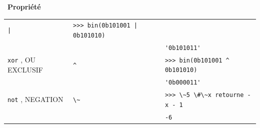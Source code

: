 \documentclass[
  11pt,
]{article}
\newcommand{\passthrough}[1]{#1}
\newcounter{prop}
\newenvironment{propriete}[1]
{\par \medskip   \addtocounter{prop}{1} \noindent  
\begin{bclogo}[arrondi =0.1,  ombre = true, barre=none, logo=\bcbook, marge=4]{~\textbf{Propriété} \textbf{\theprop} {\itshape #1} }   \par}
{
\end{bclogo}
 \par \bigskip }
\begin{document}
\begin{propriete}{}
\begin{longtable}[]{@{}lll@{}}
\begin{minipage}[t]{0.22\columnwidth}
\passthrough{\lstinline!|!}\strut
\end{minipage} & \begin{minipage}[t]{0.46\columnwidth}\raggedright
\passthrough{\lstinline!>>> bin(0b101001 | 0b101010)!}\strut
\end{minipage}\tabularnewline
\begin{minipage}[t]{0.24\columnwidth}\raggedright
\strut
\end{minipage} & \begin{minipage}[t]{0.22\columnwidth}\raggedright
\strut
\end{minipage} & \begin{minipage}[t]{0.46\columnwidth}\raggedright
\passthrough{\lstinline!'0b101011'!}\strut
\end{minipage}\tabularnewline
\begin{minipage}[t]{0.24\columnwidth}\raggedright
\passthrough{\lstinline!xor!} , OU EXCLUSIF\strut
\end{minipage} & \begin{minipage}[t]{0.22\columnwidth}\raggedright
\passthrough{\lstinline!^!}\strut
\end{minipage} & \begin{minipage}[t]{0.46\columnwidth}\raggedright
\passthrough{\lstinline!>>> bin(0b101001 ^ 0b101010)!}\strut
\end{minipage}\tabularnewline
\begin{minipage}[t]{0.24\columnwidth}\raggedright
\strut
\end{minipage} & \begin{minipage}[t]{0.22\columnwidth}\raggedright
\strut
\end{minipage} & \begin{minipage}[t]{0.46\columnwidth}\raggedright
\passthrough{\lstinline!'0b000011'!}\strut
\end{minipage}\tabularnewline
\begin{minipage}[t]{0.24\columnwidth}\raggedright
\passthrough{\lstinline!not!} , NEGATION\strut
\end{minipage} & \begin{minipage}[t]{0.22\columnwidth}\raggedright
\passthrough{\lstinline!\~!}\strut
\end{minipage} & \begin{minipage}[t]{0.46\columnwidth}\raggedright
\passthrough{\lstinline!>>> \~5 \#\~x retourne -x - 1!}\strut
\end{minipage}\tabularnewline
\begin{minipage}[t]{0.24\columnwidth}\raggedright
\strut
\end{minipage} & \begin{minipage}[t]{0.22\columnwidth}\raggedright
\strut
\end{minipage} & \begin{minipage}[t]{0.46\columnwidth}\raggedright
\passthrough{\lstinline!-6!}\strut
\end{minipage}\tabularnewline
\bottomrule
\end{longtable}

\end{propriete}
\end{document}
